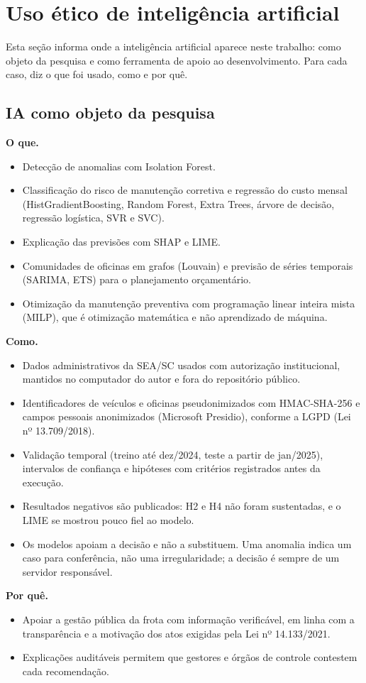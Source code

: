 \documentclass[12pt,a4paper]{article}
\begin{document}
\section{Uso ético de inteligência artificial}
\label{sec:uso-etico-ia}
Esta seção informa onde a inteligência artificial aparece neste trabalho: como objeto da pesquisa e como ferramenta de apoio ao desenvolvimento. Para cada caso, diz o que foi usado, como e por quê.

\subsection{IA como objeto da pesquisa}
\textbf{O que.}
\begin{itemize}
  \item Detecção de anomalias com Isolation Forest.
  \item Classificação do risco de manutenção corretiva e regressão do custo mensal (HistGradientBoosting, Random Forest, Extra Trees, árvore de decisão, regressão logística, SVR e SVC).
  \item Explicação das previsões com SHAP e LIME.
  \item Comunidades de oficinas em grafos (Louvain) e previsão de séries temporais (SARIMA, ETS) para o planejamento orçamentário.
  \item Otimização da manutenção preventiva com programação linear inteira mista (MILP), que é otimização matemática e não aprendizado de máquina.
\end{itemize}
\textbf{Como.}
\begin{itemize}
  \item Dados administrativos da SEA/SC usados com autorização institucional, mantidos no computador do autor e fora do repositório público.
  \item Identificadores de veículos e oficinas pseudonimizados com HMAC-SHA-256 e campos pessoais anonimizados (Microsoft Presidio), conforme a LGPD (Lei nº 13.709/2018).
  \item Validação temporal (treino até dez/2024, teste a partir de jan/2025), intervalos de confiança e hipóteses com critérios registrados antes da execução.
  \item Resultados negativos são publicados: H2 e H4 não foram sustentadas, e o LIME se mostrou pouco fiel ao modelo.
  \item Os modelos apoiam a decisão e não a substituem. Uma anomalia indica um caso para conferência, não uma irregularidade; a decisão é sempre de um servidor responsável.
\end{itemize}
\textbf{Por quê.}
\begin{itemize}
  \item Apoiar a gestão pública da frota com informação verificável, em linha com a transparência e a motivação dos atos exigidas pela Lei nº 14.133/2021.
  \item Explicações auditáveis permitem que gestores e órgãos de controle contestem cada recomendação.
\end{itemize}
\end{document}
